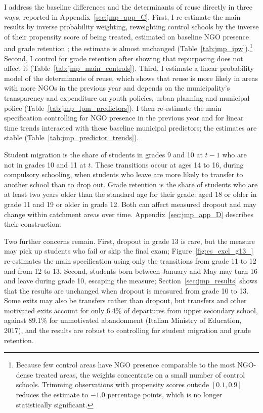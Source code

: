\documentclass[12pt]{article}
\theoremstyle{plain}
\theoremstyle{plain}
\theoremstyle{plain}
\theoremstyle{definition}
\theoremstyle{plain}
\theoremstyle{definition}
\theoremstyle{plain}
\theoremstyle{remark}
\theoremstyle{definition}
\theoremstyle{definition}
\theoremstyle{plain}
\begin{document}
\medskip
I address the baseline differences and the determinants of reuse directly in three ways, reported in Appendix~\ref{sec:jmp_app_C}. First, I re-estimate the main results by inverse probability weighting, reweighting control schools by the inverse of their propensity score of being treated, estimated on baseline NGO presence and grade retention \citep{hirano_efficient_2003}; the estimate is almost unchanged (Table~\ref{tab:jmp_ipw}).\footnote{Because few control areas have NGO presence comparable to the most NGO-dense treated areas, the weights concentrate on a small number of control schools. Trimming observations with propensity scores outside $[0.1, 0.9]$ \citep{crump_dealing_2009} reduces the estimate to $-1.0$ percentage points, which is no longer statistically significant.} Second, I control for grade retention after showing that repurposing does not affect it (Table~\ref{tab:jmp_main_controls}). Third, I estimate a linear probability model of the determinants of reuse, which shows that reuse is more likely in areas with more NGOs in the previous year and depends on the municipality's transparency and expenditure on youth policies, urban planning and municipal police (Table~\ref{tab:jmp_lpm_predictors}). I then re-estimate the main specification controlling for NGO presence in the previous year and for linear time trends interacted with these baseline municipal predictors; the estimates are stable (Table~\ref{tab:jmp_predictor_trends}). \par

Student migration is the share of students in grades 9 and 10 at $t-1$ who are not in grades 10 and 11 at $t$. These transitions occur at ages 14 to 16, during compulsory schooling, when students who leave are more likely to transfer to another school than to drop out. Grade retention is the share of students who are at least two years older than the standard age for their grade: aged 18 or older in grade 11 and 19 or older in grade 12. Both can affect measured dropout and may change within catchment areas over time. Appendix~\ref{sec:jmp_app_D} describes their construction.

Two further concerns remain. First, dropout in grade 13 is rare, but the measure may pick up students who fail or skip the final exam; Figure~\ref{fig:es_excl_g13_} re-estimates the main specification using only the transitions from grade 11 to 12 and from 12 to 13. Second, students born between January and May may turn 16 and leave during grade 10, escaping the measure; Section~\ref{sec:jmp_results} shows that the results are unchanged when dropout is measured from grade 10 to 13. Some exits may also be transfers rather than dropout, but transfers and other motivated exits account for only 6.4\% of departures from upper secondary school, against 89.1\% for unmotivated abandonment (Italian Ministry of Education, 2017), and the results are robust to controlling for student migration and grade retention. \par
\end{document}
